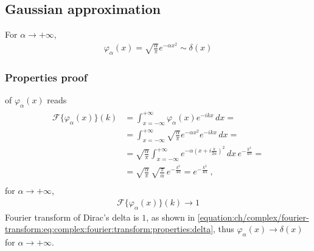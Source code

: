 \documentclass[letterpaper,10pt,english]{jupyterBook}
\begin{document}
\subsection{Gaussian approximation}
\label{\detokenize{ch/functional-analysis/dirac-delta:gaussian-approximation}}\label{\detokenize{ch/functional-analysis/dirac-delta:functional-analysis-dirac-delta-approximations-gaussian}}
\sphinxAtStartPar
For \(\alpha \rightarrow +\infty\),
\begin{equation*}
\begin{split}\varphi_{\alpha}(x) = \sqrt{\frac{\alpha}{\pi}}e^{-\alpha x^2} \sim \delta(x)\end{split}
\end{equation*}\subsubsection*{Properties \sphinxhyphen{} proof}

\sphinxAtStartPar
{\hyperref[\detokenize{ch/complex/fourier-transform:complex-fourier-transform}]{}} of \(\varphi_{\alpha}(x)\) reads
\begin{equation*}
\begin{split}\begin{aligned}
 \mathscr{F}\{ \varphi_{\alpha}(x) \}(k)
 & = \int_{x=-\infty}^{+\infty} \varphi_\alpha(x) e^{-ikx} \, dx = \\
 & = \int_{x=-\infty}^{+\infty} \sqrt{\frac{\alpha}{\pi}} e^{-\alpha x^2} e^{-ikx} \, dx = \\
 & = \sqrt{\frac{\alpha}{\pi}} \int_{x=-\infty}^{+\infty} e^{-\alpha \left( x + i \frac{k}{2 \alpha} \right)^2} \, dx \, e^{-\frac{k^2}{4 \alpha}} = \\
 & = \sqrt{\frac{\alpha}{\pi}} \, \sqrt{\frac{\pi}{\alpha}} \, e^{-\frac{k^2}{4 \alpha}} =  e^{-\frac{k^2}{4 \alpha}} \ ,\\
\end{aligned}\end{split}
\end{equation*}
\sphinxAtStartPar
for \(\alpha \rightarrow +\infty\),
\begin{equation*}
\begin{split}\mathscr{F}\{ \varphi_{\alpha}(x) \}(k) \rightarrow 1\end{split}
\end{equation*}
\sphinxAtStartPar
Fourier transform of Dirac’s delta is \(1\), as shown in \eqref{equation:ch/complex/fourier-transform:eq:complex:fourier:transform:properties:delta}, thus \(\varphi_\alpha(x) \rightarrow \delta(x)\) for \(\alpha \rightarrow +\infty\).
\end{document}
